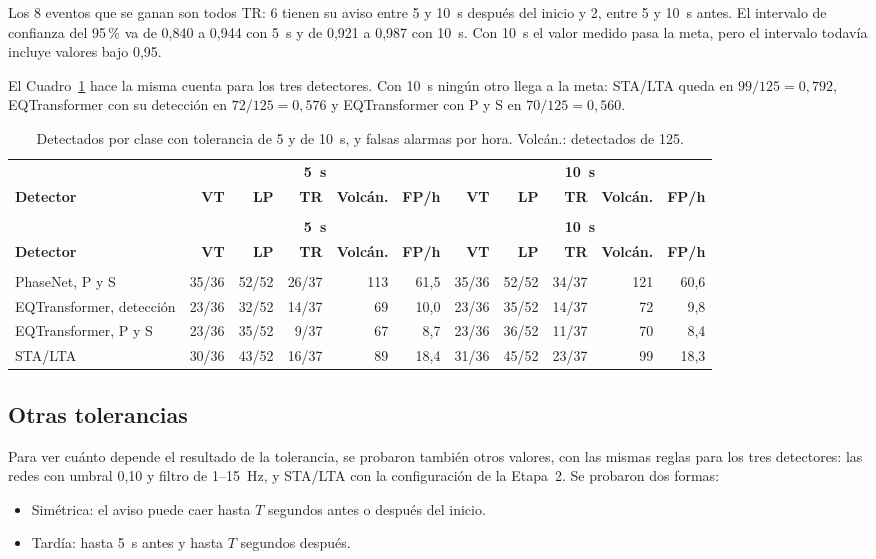 \documentclass[11pt,a4paper,oneside,spanish,oldfontcommands]{memoir}
\newcommand{\cabecera}[2]{%
  \toprule #1 \\ \midrule \endfirsthead
  \multicolumn{#2}{l}{\itshape Cuadro \thetable{} (continuación)}\\
  \toprule #1 \\ \midrule \endhead
  \midrule \multicolumn{#2}{r}{\itshape Continúa en la página siguiente}\\ \endfoot
  \bottomrule \endlastfoot}
\begin{document}
Los 8 eventos que se ganan son todos TR: 6 tienen su aviso entre 5 y 10~s
después del inicio y 2, entre 5 y 10~s antes. El intervalo de confianza del
95\,\% va de 0,840 a 0,944 con 5~s y de 0,921 a 0,987 con 10~s. Con 10~s el valor medido
pasa la meta, pero el intervalo todavía incluye valores bajo 0,95.

El Cuadro~\ref{tab:tol-clase} hace la misma cuenta para los tres detectores.
Con 10~s ningún otro llega a la meta: STA/LTA queda en $99/125 = 0{,}792$,
EQTransformer con su detección en $72/125 = 0{,}576$ y EQTransformer con P y S
en $70/125 = 0{,}560$.

{\small
\setlength{\tabcolsep}{2.5pt}
\begin{longtable}{>{\raggedright\arraybackslash}p{4.2cm}rrrrrrrrrr}
\caption{Detectados por clase con tolerancia de 5 y de 10~s, y falsas alarmas por hora. Volcán.: detectados de 125.}\label{tab:tol-clase}\\
\cabecera{ & \multicolumn{5}{c}{\textbf{5~s}} & \multicolumn{5}{c}{\textbf{10~s}} \\ \textbf{Detector} & \textbf{VT} & \textbf{LP} & \textbf{TR} & \textbf{Volcán.} & \textbf{FP/h} & \textbf{VT} & \textbf{LP} & \textbf{TR} & \textbf{Volcán.} & \textbf{FP/h}}{11}
PhaseNet, P y S & 35/36 & 52/52 & 26/37 & 113 & 61,5 & 35/36 & 52/52 & 34/37 & 121 & 60,6 \\
EQTransformer, detección & 23/36 & 32/52 & 14/37 & 69 & 10,0 & 23/36 & 35/52 & 14/37 & 72 & 9,8 \\
EQTransformer, P y S & 23/36 & 35/52 & 9/37 & 67 & 8,7 & 23/36 & 36/52 & 11/37 & 70 & 8,4 \\
STA/LTA & 30/36 & 43/52 & 16/37 & 89 & 18,4 & 31/36 & 45/52 & 23/37 & 99 & 18,3 \\
\end{longtable}
}

\subsection*{Otras tolerancias}

Para ver cuánto depende el resultado de la tolerancia, se probaron también
otros valores, con las mismas reglas para los tres detectores: las redes con umbral
0,10 y filtro de 1--15~Hz, y STA/LTA con la configuración de la Etapa~2. Se
probaron dos formas:

\begin{itemize}
\item Simétrica: el aviso puede caer hasta $T$ segundos antes o
  después del inicio.
\item Tardía: hasta 5~s antes y hasta $T$ segundos después.
\end{itemize}
\end{document}
